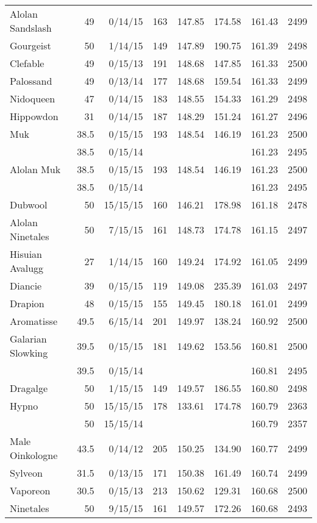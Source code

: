 \begin{longtable}{lrrrrrrr}
Alolan Sandslash & 49 & 0/14/15 & 163 & 147.85 & 174.58 & 161.43 & 2499\\
Gourgeist & 50 & 1/14/15 & 149 & 147.89 & 190.75 & 161.39 & 2498\\
Clefable & 49 & 0/15/13 & 191 & 148.68 & 147.85 & 161.33 & 2500\\
Palossand & 49 & 0/13/14 & 177 & 148.68 & 159.54 & 161.33 & 2499\\
Nidoqueen & 47 & 0/14/15 & 183 & 148.55 & 154.33 & 161.29 & 2498\\
Hippowdon & 31 & 0/14/15 & 187 & 148.29 & 151.24 & 161.27 & 2496\\
Muk & 38.5 & 0/15/15 & 193 & 148.54 & 146.19 & 161.23 & 2500\\
 & 38.5 & 0/15/14 & & & & 161.23 & 2495\\
Alolan Muk & 38.5 & 0/15/15 & 193 & 148.54 & 146.19 & 161.23 & 2500\\
 & 38.5 & 0/15/14 & & & & 161.23 & 2495\\
Dubwool & 50 & 15/15/15 & 160 & 146.21 & 178.98 & 161.18 & 2478\\
Alolan Ninetales & 50 & 7/15/15 & 161 & 148.73 & 174.78 & 161.15 & 2497\\
Hisuian Avalugg & 27 & 1/14/15 & 160 & 149.24 & 174.92 & 161.05 & 2499\\
Diancie & 39 & 0/15/15 & 119 & 149.08 & 235.39 & 161.03 & 2497\\
Drapion & 48 & 0/15/15 & 155 & 149.45 & 180.18 & 161.01 & 2499\\
Aromatisse & 49.5 & 6/15/14 & 201 & 149.97 & 138.24 & 160.92 & 2500\\
Galarian Slowking & 39.5 & 0/15/15 & 181 & 149.62 & 153.56 & 160.81 & 2500\\
 & 39.5 & 0/15/14 & & & & 160.81 & 2495\\
Dragalge & 50 & 1/15/15 & 149 & 149.57 & 186.55 & 160.80 & 2498\\
Hypno & 50 & 15/15/15 & 178 & 133.61 & 174.78 & 160.79 & 2363\\
 & 50 & 15/15/14 & & & & 160.79 & 2357\\
Male Oinkologne & 43.5 & 0/14/12 & 205 & 150.25 & 134.90 & 160.77 & 2499\\
Sylveon & 31.5 & 0/13/15 & 171 & 150.38 & 161.49 & 160.74 & 2499\\
Vaporeon & 30.5 & 0/15/13 & 213 & 150.62 & 129.31 & 160.68 & 2500\\
Ninetales & 50 & 9/15/15 & 161 & 149.57 & 172.26 & 160.68 & 2493\\

\end{longtable}
